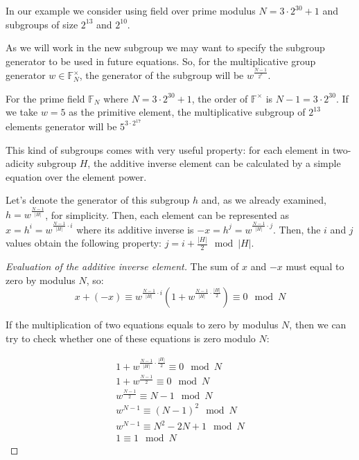 \documentclass[../lecture-notes.tex]{subfiles}
\begin{document}
\begin{remark}
In our example we consider using field over prime modulus $N = 3\cdot 2^{30} + 1$ and subgroups of size $2^{13}$ and $2^{10}$.
\end{remark}

As we will work in the new subgroup we may want to specify the subgroup generator to be used in future equations. So, for the multiplicative group generator $w \in \mathbb{F}_N^{\times}$, the generator of the subgroup will be $w^\frac{N - 1}{2^k}$.

\begin{example}
For the prime field $\mathbb{F}_N$ where $N = 3\cdot 2^{30} + 1$, the order of $\mathbb{F}^{\times}$ is $N-1 = 3\cdot 2^{30}$. If we take $w = 5$ as the primitive element, the multiplicative subgroup of $2^{13}$ elements generator will be $5^{3\cdot 2^{17}}$
\end{example}

This kind of subgroups comes with very useful property: for each element in two-adicity subgroup $H$, the additive inverse element can be calculated by a simple equation over the element power.

Let's denote the generator of this subgroup $h$ and, as we already examined, $h = w^{\frac{N - 1}{|H|}}$, for simplicity. Then, each element can be represented as $x = h^i = w^{\frac{N - 1}{|H|} \cdot i}$ where its additive inverse is $-x = h^j = w^{\frac{N - 1}{|H|} \cdot j}$. Then, the $i$ and $j$ values obtain the following property: $j = i + \frac{|H|}{2} \mod |H|$.

\begin{proof}[Evaluation of the additive inverse element]
The sum of $x$ and $-x$ must equal to zero by modulus $N$, so:
\begin{equation*}
x + (-x) \equiv w^{\frac{N - 1}{|H|}\cdot i}(1 + w^{\frac{N - 1}{|H|} \cdot \frac{|H|}{2}}) \equiv 0 \mod N
\end{equation*}

If the multiplication of two equations equals to zero by modulus $N$, then we can try to check whether one of these equations is zero modulo $N$:

\begin{gather*}
    1 + w^{\frac{N - 1}{|H|} \cdot \frac{|H|}{2}} \equiv 0 \mod N\\
    1 + w^{\frac{N - 1}{2}} \equiv 0 \mod N\\
    w^{\frac{N - 1}{2}} \equiv N - 1 \mod N\\
    w^{N - 1} \equiv (N - 1)^2 \mod N\\
    w^{N - 1} \equiv N^2 - 2N + 1 \mod N\\
    1  \equiv 1 \mod N
\end{gather*}
\end{proof}
\end{document}
